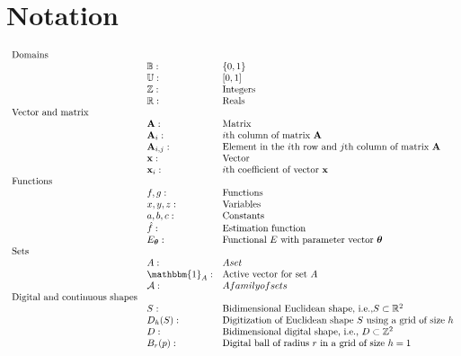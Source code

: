 \chapter{Notation}
\label{chapter:notation}

\[
\begin{array}{lll}
\text{Domains} & &\\
&\mathbb{B}: & \{0,1\}\\
&\mathbb{U}: & [0,1]\\
&\mathbb{Z}: & \text{Integers}\\
&\mathbb{R}: & \text{Reals}\\

\text{Vector and matrix} & &\\
&\mathbf{A}: & \text{Matrix}\\
&\mathbf{A}_i: & \text{$i$th column of matrix $\mathbf{A}$}\\
&\mathbf{A}_{i,j}: & \text{Element in the $i$th row and $j$th column of matrix $\mathbf{A}$}\\
&\mathbf{x}: & \text{Vector}\\
&\mathbf{x}_i: & \text{$i$th coefficient of vector $\mathbf{x}$}\\

\text{Functions} & &\\
&f,g: & \text{Functions}\\
& x,y,z: & \text{Variables} \\
& a,b,c: & \text{Constants} \\
&\hat{f}: & \text{Estimation function}\\
&E_{\boldsymbol{\theta}}: & \text{Functional }E \text{ with parameter vector } \boldsymbol{\theta} \\

\text{Sets} & &\\
& A: & A set\\
& \mathbbm{1}_A: & \text{Active vector for set $A$}\\
& \mathcal{A}: & A family of sets\\

\text{Digital and continuous shapes} & &\\
&S: & \text{Bidimensional Euclidean shape, i.e.,} S \subset \mathbb{R}^2\\
&D_h(S): & \text{Digitization of Euclidean shape }S \text{ using a grid of size }h\\
&D: & \text{Bidimensional digital shape, i.e., }D \subset \mathbb{Z}^2\\
&B_r(p): & \text{Digital ball of radius }r \text{ in a grid of size } h=1 \\


\end{array}
\]
